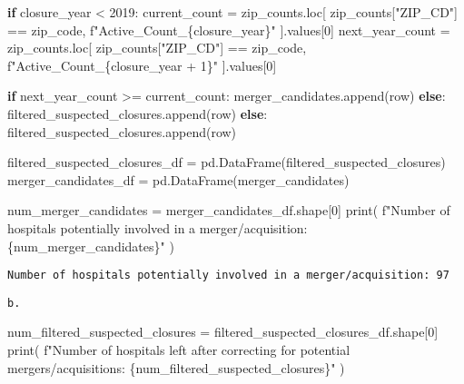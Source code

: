 \documentclass[
  letterpaper,
  DIV=11,
  numbers=noendperiod]{scrartcl}
\newenvironment{Shaded}{\begin{snugshade}}{\end{snugshade}}
\newcommand{\BuiltInTok}[1]{\textcolor[rgb]{0.00,0.23,0.31}{#1}}
\newcommand{\ControlFlowTok}[1]{\textcolor[rgb]{0.00,0.23,0.31}{\textbf{#1}}}
\newcommand{\DecValTok}[1]{\textcolor[rgb]{0.68,0.00,0.00}{#1}}
\newcommand{\NormalTok}[1]{\textcolor[rgb]{0.00,0.23,0.31}{#1}}
\newcommand{\OperatorTok}[1]{\textcolor[rgb]{0.37,0.37,0.37}{#1}}
\newcommand{\SpecialCharTok}[1]{\textcolor[rgb]{0.37,0.37,0.37}{#1}}
\newcommand{\SpecialStringTok}[1]{\textcolor[rgb]{0.13,0.47,0.30}{#1}}
\newcommand{\StringTok}[1]{\textcolor[rgb]{0.13,0.47,0.30}{#1}}
\begin{document}
\begin{Shaded}
\begin{Highlighting}[]
    \ControlFlowTok{if}\NormalTok{ closure\_year }\OperatorTok{\textless{}} \DecValTok{2019}\NormalTok{:}
\NormalTok{        current\_count }\OperatorTok{=}\NormalTok{ zip\_counts.loc[}
\NormalTok{            zip\_counts[}\StringTok{"ZIP\_CD"}\NormalTok{] }\OperatorTok{==}\NormalTok{ zip\_code, }\SpecialStringTok{f"Active\_Count\_}\SpecialCharTok{\{}\NormalTok{closure\_year}\SpecialCharTok{\}}\SpecialStringTok{"}
\NormalTok{        ].values[}\DecValTok{0}\NormalTok{]}
\NormalTok{        next\_year\_count }\OperatorTok{=}\NormalTok{ zip\_counts.loc[}
\NormalTok{            zip\_counts[}\StringTok{"ZIP\_CD"}\NormalTok{] }\OperatorTok{==}\NormalTok{ zip\_code, }\SpecialStringTok{f"Active\_Count\_}\SpecialCharTok{\{}\NormalTok{closure\_year }\OperatorTok{+} \DecValTok{1}\SpecialCharTok{\}}\SpecialStringTok{"}
\NormalTok{        ].values[}\DecValTok{0}\NormalTok{]}

        \ControlFlowTok{if}\NormalTok{ next\_year\_count }\OperatorTok{\textgreater{}=}\NormalTok{ current\_count:}
\NormalTok{            merger\_candidates.append(row)}
        \ControlFlowTok{else}\NormalTok{:}
\NormalTok{            filtered\_suspected\_closures.append(row)}
    \ControlFlowTok{else}\NormalTok{:}
\NormalTok{        filtered\_suspected\_closures.append(row)}

\NormalTok{filtered\_suspected\_closures\_df }\OperatorTok{=}\NormalTok{ pd.DataFrame(filtered\_suspected\_closures)}
\NormalTok{merger\_candidates\_df }\OperatorTok{=}\NormalTok{ pd.DataFrame(merger\_candidates)}

\NormalTok{num\_merger\_candidates }\OperatorTok{=}\NormalTok{ merger\_candidates\_df.shape[}\DecValTok{0}\NormalTok{]}
\BuiltInTok{print}\NormalTok{(}
    \SpecialStringTok{f"Number of hospitals potentially involved in a merger/acquisition: }\SpecialCharTok{\{}\NormalTok{num\_merger\_candidates}\SpecialCharTok{\}}\SpecialStringTok{"}
\NormalTok{)}
\end{Highlighting}
\end{Shaded}

\begin{verbatim}
Number of hospitals potentially involved in a merger/acquisition: 97
\end{verbatim}

\begin{verbatim}
b. 
\end{verbatim}

\begin{Shaded}
\begin{Highlighting}[]
\NormalTok{num\_filtered\_suspected\_closures }\OperatorTok{=}\NormalTok{ filtered\_suspected\_closures\_df.shape[}\DecValTok{0}\NormalTok{]}
\BuiltInTok{print}\NormalTok{(}
    \SpecialStringTok{f"Number of hospitals left after correcting for potential mergers/acquisitions: }\SpecialCharTok{\{}\NormalTok{num\_filtered\_suspected\_closures}\SpecialCharTok{\}}\SpecialStringTok{"}
\NormalTok{)}
\end{Highlighting}
\end{Shaded}
\end{document}

